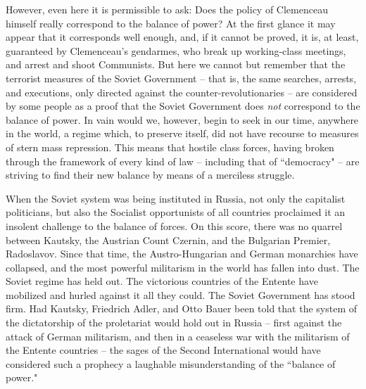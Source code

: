 \documentclass[12pt]{article}
\begin{document}
\vspace{12pt}
However, even here it is permissible to ask: Does the policy of
Clemenceau himself really correspond to the balance of power? At the
first glance it may appear that it corresponds well enough, and, if
it cannot be proved, it is, at least, guaranteed by Clemenceau's
gendarmes, who break up working-class meetings, and arrest and
shoot Communists. But here we cannot but remember that the
terrorist measures of the Soviet Government -- that is, the same
searches, arrests, and executions, only directed against the
counter-revolutionaries -- are considered by some people as a proof that
the Soviet Government does \emph{not} correspond to the balance of power.
In vain would we, however, begin to seek in our time, anywhere in the
world, a regime which, to preserve itself, did not have recourse to
measures of stern mass repression. This means that hostile class
forces, having broken through the framework of every kind of
law -- including that of ``democracy" -- are striving to find their new
balance by means of a merciless struggle.

\vspace{12pt}
When the Soviet system was being instituted in Russia, not only the
capitalist politicians, but also the Socialist opportunists of all
countries proclaimed it an insolent challenge to the balance of
forces. On this score, there was no quarrel between Kautsky, the
Austrian Count Czernin, and the Bulgarian Premier, Radoslavov. Since
that time, the Austro-Hungarian and German monarchies have collapsed,
and the most powerful militarism in the world has fallen into dust.
The Soviet regime has held out. The victorious countries of the
Entente have mobilized and hurled against it all they could. The
Soviet Government has stood firm. Had Kautsky, Friedrich Adler, and
Otto Bauer been told that the system of the dictatorship of the
proletariat would hold out in Russia -- first against the attack of
German militarism, and then in a ceaseless war with the militarism of
the Entente countries -- the sages of the Second International would
have considered such a prophecy a laughable misunderstanding of the
``balance of power."
\end{document}
